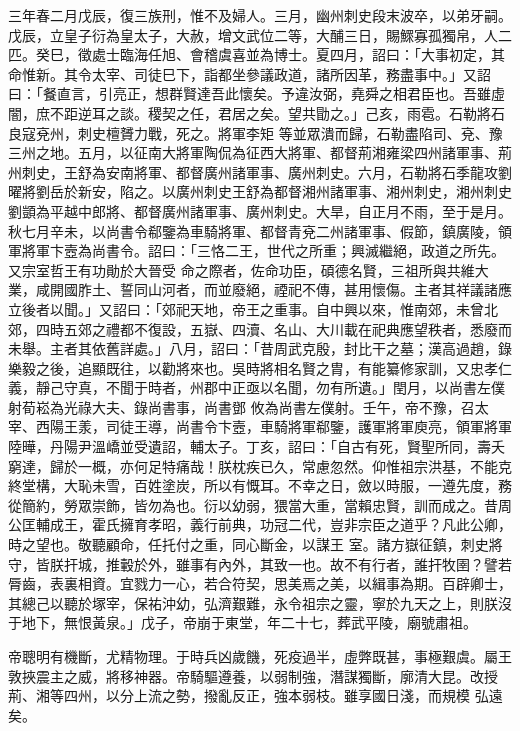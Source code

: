\begin{pinyinscope}
 三年春二月戊辰，復三族刑，惟不及婦人。三月，幽州刺史段末波卒，以弟牙嗣。戊辰，立皇子衍為皇太子，大赦，增文武位二等，大酺三日，賜鰥寡孤獨帛，人二匹。癸巳，徵處士臨海任旭、會稽虞喜並為博士。夏四月，詔曰：「大事初定，其命惟新。其令太宰、司徒巳下，詣都坐參議政道，諸所因革，務盡事中。」又詔曰：「餐直言，引亮正，想群賢達吾此懷矣。予違汝弼，堯舜之相君臣也。吾雖虛闇，庶不距逆耳之談。稷契之任，君居之矣。望共勖之。」己亥，雨雹。石勒將石良寇兗州，刺史檀贇力戰，死之。將軍李矩
 等並眾潰而歸，石勒盡陷司、兗、豫三州之地。五月，以征南大將軍陶侃為征西大將軍、都督荊湘雍梁四州諸軍事、荊州刺史，王舒為安南將軍、都督廣州諸軍事、廣州刺史。六月，石勒將石季龍攻劉曜將劉岳於新安，陷之。以廣州刺史王舒為都督湘州諸軍事、湘州刺史，湘州刺史劉顗為平越中郎將、都督廣州諸軍事、廣州刺史。大旱，自正月不雨，至于是月。秋七月辛未，以尚書令郗鑒為車騎將軍、都督青兗二州諸軍事、假節，鎮廣陵，領軍將軍卞壼為尚書令。詔曰：「三恪二王，世代之所重；興滅繼絕，政道之所先。又宗室哲王有功勛於大晉受
 命之際者，佐命功臣，碩德名賢，三祖所與共維大業，咸開國胙土、誓同山河者，而並廢絕，禋祀不傳，甚用懷傷。主者其祥議諸應立後者以聞。」又詔曰：「郊祀天地，帝王之重事。自中興以來，惟南郊，未曾北郊，四時五郊之禮都不復設，五嶽、四瀆、名山、大川載在祀典應望秩者，悉廢而未舉。主者其依舊詳處。」八月，詔曰：「昔周武克殷，封比干之墓；漢高過趙，錄樂毅之後，追顯既往，以勸將來也。吳時將相名賢之胄，有能纂修家訓，又忠孝仁義，靜己守真，不聞于時者，州郡中正亟以名聞，勿有所遺。」閏月，以尚書左僕射荀崧為光祿大夫、錄尚書事，尚書鄧
 攸為尚書左僕射。壬午，帝不豫，召太宰、西陽王羕，司徒王導，尚書令卞壼，車騎將軍郗鑒，護軍將軍庾亮，領軍將軍陸曄，丹陽尹溫嶠並受遺詔，輔太子。丁亥，詔曰：「自古有死，賢聖所同，壽夭窮達，歸於一概，亦何足特痛哉！朕枕疾已久，常慮忽然。仰惟祖宗洪基，不能克終堂構，大恥未雪，百姓塗炭，所以有慨耳。不幸之日，斂以時服，一遵先度，務從簡約，勞眾崇飾，皆勿為也。衍以幼弱，猥當大重，當賴忠賢，訓而成之。昔周公匡輔成王，霍氏擁育孝昭，義行前典，功冠二代，豈非宗臣之道乎？凡此公卿，時之望也。敬聽顧命，任托付之重，同心斷金，以謀王
 室。諸方嶽征鎮，刺史將守，皆朕扞城，推轂於外，雖事有內外，其致一也。故不有行者，誰扞牧圉？譬若脣齒，表裏相資。宜戮力一心，若合符契，思美焉之美，以緝事為期。百辟卿士，其總己以聽於塚宰，保祐沖幼，弘濟艱難，永令祖宗之靈，寧於九天之上，則朕沒于地下，無恨黃泉。」戊子，帝崩于東堂，年二十七，葬武平陵，廟號肅祖。



 帝聰明有機斷，尤精物理。于時兵凶歲饑，死疫過半，虛弊既甚，事極艱虞。屬王敦挾震主之威，將移神器。帝騎驅遵養，以弱制強，潛謀獨斷，廓清大昆。改授荊、湘等四州，以分上流之勢，撥亂反正，強本弱枝。雖享國日淺，而規模
 弘遠矣。




\end{pinyinscope}
